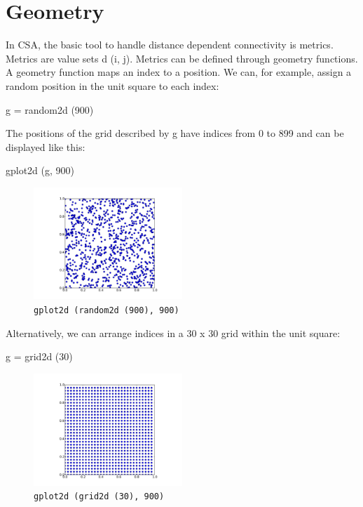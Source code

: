 \documentclass[a4paper,twoside]{report}
\newcommand{\expr}[1]{\lstinline|#1|}
\begin{document}
\section{Geometry}

In CSA, the basic tool to handle distance dependent connectivity is
metrics.  Metrics are value sets d (i, j).  Metrics can be defined
through geometry functions.  A geometry function maps an index to a
position.  We can, for example, assign a random position in the unit
square to each index:

\begin{code}{}
  g = random2d (900)
\end{code}

The positions of the grid described by g have indices from 0 to 899
and can be displayed like this:

\begin{code}{}
  gplot2d (g, 900)
\end{code}

\begin{figure}
  \begin{center}
    \includegraphics[width=0.5\textwidth]{figures/random2d}
    \caption[Random geometry]{\label{fig:random2d}
      \expr{gplot2d (random2d (900), 900)}
    }
  \end{center}
\end{figure}

Alternatively, we can arrange indices in a 30 x 30 grid within the
unit square:

\begin{code}{}
  g = grid2d (30)
\end{code}

\begin{figure}
  \begin{center}
    \includegraphics[width=0.5\textwidth]{figures/grid2d}
    \caption[Random geometry]{\label{fig:grid2d}
      \expr{gplot2d (grid2d (30), 900)}
    }
  \end{center}
\end{figure}
\end{document}
